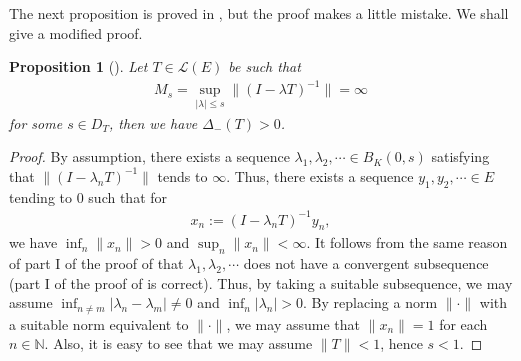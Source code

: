 \documentclass[12pt]{amsart}
\theoremstyle{plain}
\newtheorem{prop} {Proposition} [section]
\theoremstyle{definition}
\begin{document}
The next proposition is proved in \cite{comp}, but the proof makes a little mistake. We shall give a modified proof.

\begin{prop}[{\cite[Proposition 6.12]{comp}}] \label{app6}
  Let $T \in \mathcal{L}(E)$ be such that
  \begin{align*}
    M_s = \sup_{|\lambda| \le s} \|(I - \lambda T)^{-1}\| = \infty
  \end{align*}
  for some $s \in D_T$, then we have $\Delta_{-}(T) > 0$.
\end{prop}
\begin{proof}
  By assumption, there exists a sequence $\lambda_1, \lambda_2, \cdots \in B_K(0,s)$ satisfying that $\|(I - \lambda_n T)^{-1}\|$ tends to $\infty$. Thus, there exists a sequence $y_1, y_2, \cdots \in E$ tending to $0$ such that for
  \begin{align*}
    x_n := (I - \lambda_n T)^{-1} y_n,
  \end{align*}
we have $\inf_n \|x_n\| > 0$ and $\sup_n \|x_n\| < \infty$. It follows from the same reason of part \textrm{I} of the proof of \cite[Proposition 6.12]{comp} that $\lambda_1, \lambda_2, \cdots$ does not have a convergent subsequence (part \textrm{I} of the proof of \cite[Proposition 6.12,]{comp} is correct). Thus, by taking a suitable subsequence, we may assume $\inf_{n \neq m} |\lambda_n - \lambda_m| \neq 0$ and $\inf_n |\lambda_n| > 0$. By replacing a norm $\|\cdot\|$ with a suitable norm equivalent to $\|\cdot\|$, we may assume that $\|x_n\| = 1$ for each $n \in \mathbb{N}$. Also, it is easy to see that we may assume $\|T\| < 1$, hence $s < 1$. \par


\end{proof}
\end{document}
